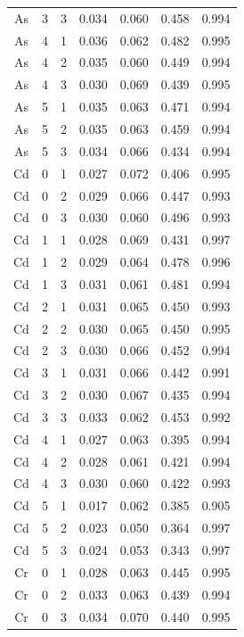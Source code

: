 \documentclass[ms, hidelinks]{uncgdissertationexp3}
\theoremstyle{plain}
\theoremstyle{definition}
\theoremstyle{remark}
\begin{document}
\begin{longtable}{ccccccc}
  As & 3 & 3 & 0.034 & 0.060 & 0.458 & 0.994\\
  \rowcolor{gray!6}  As & 4 & 1 & 0.036 & 0.062 & 0.482 & 0.995\\
  As & 4 & 2 & 0.035 & 0.060 & 0.449 & 0.994\\
  \rowcolor{gray!6}  As & 4 & 3 & 0.030 & 0.069 & 0.439 & 0.995\\
  As & 5 & 1 & 0.035 & 0.063 & 0.471 & 0.994\\
  \rowcolor{gray!6}  As & 5 & 2 & 0.035 & 0.063 & 0.459 & 0.994\\
  As & 5 & 3 & 0.034 & 0.066 & 0.434 & 0.994\\
  \rowcolor{gray!6}  Cd & 0 & 1 & 0.027 & 0.072 & 0.406 & 0.995\\
  Cd & 0 & 2 & 0.029 & 0.066 & 0.447 & 0.993\\
  \rowcolor{gray!6}  Cd & 0 & 3 & 0.030 & 0.060 & 0.496 & 0.993\\
  Cd & 1 & 1 & 0.028 & 0.069 & 0.431 & 0.997\\
  \rowcolor{gray!6}  Cd & 1 & 2 & 0.029 & 0.064 & 0.478 & 0.996\\
  Cd & 1 & 3 & 0.031 & 0.061 & 0.481 & 0.994\\
  \rowcolor{gray!6}  Cd & 2 & 1 & 0.031 & 0.065 & 0.450 & 0.993\\
  Cd & 2 & 2 & 0.030 & 0.065 & 0.450 & 0.995\\
  \rowcolor{gray!6}  Cd & 2 & 3 & 0.030 & 0.066 & 0.452 & 0.994\\
  Cd & 3 & 1 & 0.031 & 0.066 & 0.442 & 0.991\\
  \rowcolor{gray!6}  Cd & 3 & 2 & 0.030 & 0.067 & 0.435 & 0.994\\
  Cd & 3 & 3 & 0.033 & 0.062 & 0.453 & 0.992\\
  \rowcolor{gray!6}  Cd & 4 & 1 & 0.027 & 0.063 & 0.395 & 0.994\\
  Cd & 4 & 2 & 0.028 & 0.061 & 0.421 & 0.994\\
  \rowcolor{gray!6}  Cd & 4 & 3 & 0.030 & 0.060 & 0.422 & 0.993\\
  Cd & 5 & 1 & 0.017 & 0.062 & 0.385 & 0.905\\
  \rowcolor{gray!6}  Cd & 5 & 2 & 0.023 & 0.050 & 0.364 & 0.997\\
  Cd & 5 & 3 & 0.024 & 0.053 & 0.343 & 0.997\\
  \rowcolor{gray!6}  Cr & 0 & 1 & 0.028 & 0.063 & 0.445 & 0.995\\
  Cr & 0 & 2 & 0.033 & 0.063 & 0.439 & 0.994\\
  \rowcolor{gray!6}  Cr & 0 & 3 & 0.034 & 0.070 & 0.440 & 0.995\\

\end{longtable}
\end{document}
